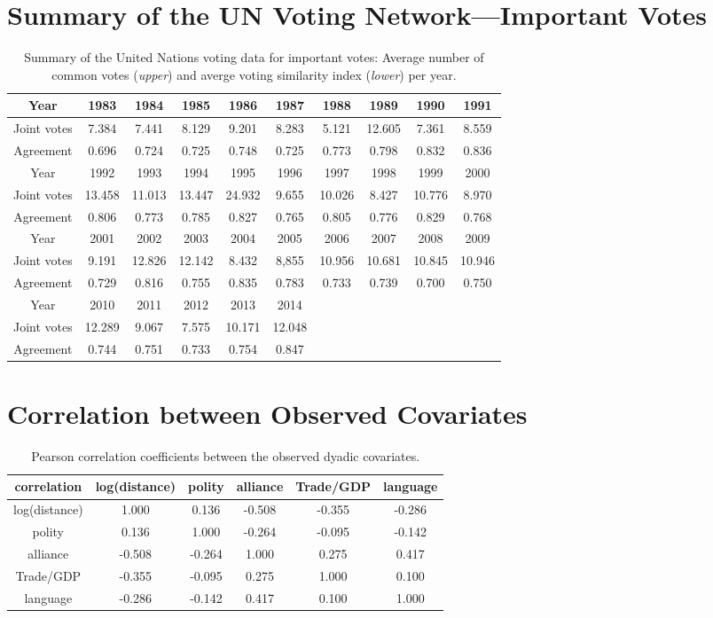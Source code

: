 \documentclass[a4paper]{article}
\begin{document}
\begin{appendices}
\section{Summary of the UN Voting Network---Important Votes}\label{appendix: summarystat}
\begin{table}[ht]
	\centering
	\begin{tabular}{ |c|c|c|c|c|c|c|c|c|c|} 
		\hline
		{Year}	& 1983 & 1984& 1985& 1986 & 1987& 1988& 1989&1990&1991\\ \hline
		Joint votes & 7.384&7.441&8.129&9.201&8.283&5.121&12.605&7.361&8.559\\\hline
		Agreement & 0.696& 0.724& 0.725 & 0.748& 0.725& 0.773 & 0.798& 0.832& 0.836\\\hline\hline 
		{Year}	& 1992&1993& 1994 & 1995& 1996& 1997 & 1998& 1999& 2000\\ \hline
		Joint votes  &13.458&11.013&13.447&24.932&9.655&10.026&8.427&10.776&8.970\\\hline
	Agreement & 0.806&0.773& 0.785& 0.827& 0.765& 0.805& 0.776& 0.829 & 0.768\\\hline\hline
		{Year}	&2001&2002&2003&2004&2005& 2006& 2007& 2008&  2009\\ \hline
		Joint votes &9.191&12.826&12.142&8.432&8,855&10.956&10.681&10.845&10.946\\\hline
	Agreement &0.729& 0.816& 0.755& 0.835& 0.783& 0.733& 0.739&0.700&0.750\\		\hline\hline
		Year & 2010& 2011&2012&2013&2014&&&&\\\hline
		Joint votes&12.289&9.067&7.575&10.171&12.048&&&&\\\hline
	Agreement&  0.744& 0.751& 0.733&0.754&0.847&&&&\\\hline
	\end{tabular}
	\caption {Summary of the United Nations voting data for important votes: Average number of common votes (\textit{upper}) and averge voting similarity index (\textit{lower}) per year.}
	\label{table:EDA}
\end{table}
\newpage
\section{Correlation between Observed Covariates}\label{appendix: correlations}
\begin{table}[ht]
	\centering
	\begin{tabular}{ |c|ccccc|} 
		\hline
	correlation & 	log(distance) & polity &   alliance &  Trade/GDP  &  language\\
	 \hline
			log(distance)& 1.000& 0.136&  -0.508&-0.355&-0.286\\
			polity&0.136&1.000& -0.264&-0.095&-0.142\\
			alliance& -0.508&-0.264&1.000&0.275& 0.417\\
			Trade/GDP&  -0.355& -0.095& 0.275& 1.000& 0.100\\
			language& -0.286&-0.142& 0.417& 0.100& 1.000\\
					\hline
	\end{tabular}
	\caption {Pearson correlation coefficients between the observed dyadic covariates.}
	\label{table:correlation}
\end{table}


\end{appendices}
\end{document}
